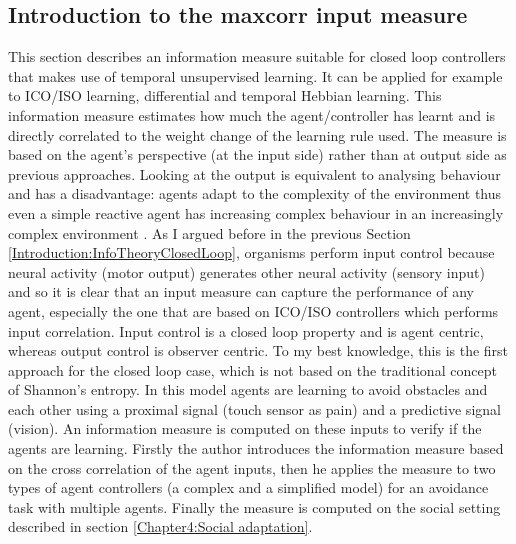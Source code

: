 \subsection{Introduction to the maxcorr input measure}
This section describes an information measure suitable for closed loop
controllers that makes use of temporal unsupervised learning. It can be applied
for example to ICO/ISO learning, differential and temporal Hebbian learning.
This information measure estimates how much the agent/controller has learnt
and is directly correlated to the weight change of the learning rule used.
The measure is based on the agent's perspective (at the input side) rather
than at output side as previous approaches. Looking at the output is equivalent
 to analysing behaviour and has a disadvantage: agents adapt to the complexity
of the environment thus even a simple reactive agent has increasing complex
behaviour in an increasingly complex environment \citep{NolfiInteraction}.
As I argued before in the previous Section \ref{Introduction:InfoTheoryClosedLoop}, 
organisms perform input control because
neural activity (motor output) generates other neural activity (sensory input) and 
so it is clear that an input measure can capture the performance of any agent, especially
 the one that are based on ICO/ISO controllers which performs input correlation.
Input                                                                                                                                                                                                                                                                                                                                                                                                                                                                                                                                                                                                                                                                                                                                                                                                               control is a closed loop property and is agent centric, whereas output control is 
observer centric. 
To my best knowledge, this is the first approach for the closed loop case,
which is not based on the traditional concept of Shannon's entropy.
In this model agents are learning to avoid obstacles and each other using a proximal signal
(touch sensor as pain) and a predictive signal (vision). An information
measure is computed on these inputs to verify if the agents are learning.
Firstly the author introduces the information measure based on the cross correlation
of the agent inputs, then he applies the measure to two types of agent controllers (a complex and a simplified model)
for an avoidance task with multiple agents.
Finally the measure is computed on the social setting described in section \ref{Chapter4:Social adaptation}.

